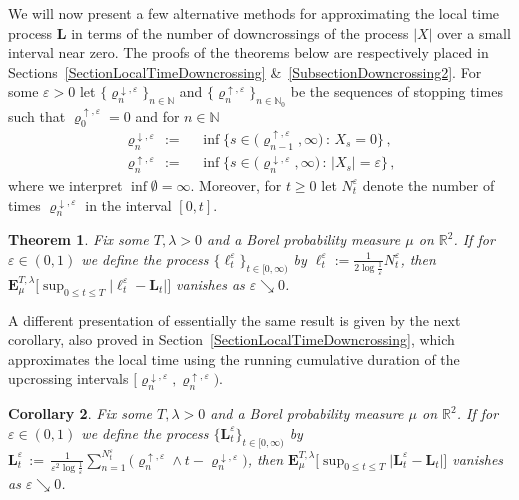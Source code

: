\documentclass[10pt]{article}
\numberwithin{equation}{section}
\newtheorem{theorem}{Theorem}[section]
\newtheorem{corollary}[theorem]{Corollary}
\theoremstyle{definition}
\newcommand{\R}{{\mathbb R}}
\begin{document}
We will now present  a few alternative methods for approximating the local time process $\mathbf{L}$ in terms of the number of downcrossings of the process $|X|$ over a small interval near zero. The proofs of the theorems below are respectively placed in Sections~\ref{SectionLocalTimeDowncrossing} \&~\ref{SubsectionDowncrossing2}.  For some $\varepsilon>0$  let $\{\varrho_{n}^{\downarrow,\varepsilon}\}_{n\in \mathbb{N}}$ and $\{\varrho_{n}^{\uparrow,\varepsilon}\}_{n\in \mathbb{N}_0}$ be the  sequences of stopping times such that $\varrho_{0}^{\uparrow,\varepsilon}=0$ and for $n\in \mathbb{N}$
\begin{align}\label{VARRHOS}
\varrho_{n}^{\downarrow,\varepsilon}\,:=\,&\,\inf\big\{s\in \big(\varrho_{n-1}^{\uparrow,\varepsilon},\infty\big) \,:\,X_s = 0 \big\}\,, \nonumber   \\
\varrho_{n}^{\uparrow,\varepsilon}\,:=\,&\,\inf\big\{s\in \big(\varrho_{n}^{\downarrow,\varepsilon},\infty\big)\,:\,|X_s| = \varepsilon  \big\}\,,
\end{align}
where we interpret $\inf \emptyset =\infty$.  Moreover, for $t\geq 0$ let  $N_{t}^{\varepsilon}$ denote the number of times $\varrho_{n}^{\downarrow,\varepsilon}$  in the interval $[0,t]$. 
\begin{theorem}\label{THMLocalTime1} Fix some $T,\lambda >0$ and  a Borel probability measure $\mu$  on $\R^2$. If for $\varepsilon\in (0,1)$ we define the process $\{\ell_{t}^{\varepsilon}\}_{t\in [0,\infty)}$ by $ \ell_{t}^{\varepsilon}:=\frac{1 }{  2\log \frac{1}{\varepsilon} }N_{t}^{\varepsilon}$, then $\mathbf{E}^{T,\lambda}_{\mu}\big[\sup_{0\leq t\leq T}\big|  \ell_t^{\varepsilon}  -\mathbf{L}_t  \big|    \big]$ vanishes as $\varepsilon \searrow 0$.
\end{theorem}

A different presentation of essentially  the same result is given by the next corollary, also proved in Section~\ref{SectionLocalTimeDowncrossing}, which  approximates the local time using the running cumulative duration of the upcrossing intervals $\big[\varrho_{n}^{\downarrow,\varepsilon},  \varrho_{n}^{\uparrow,\varepsilon}\big)$.  
\begin{corollary}\label{THMLocalTime1.5} Fix some $T,\lambda >0$ and a  Borel probability measure $\mu$  on $\R^2$.  If for $\varepsilon\in (0,1)$ we
  define the process   $\{\mathbf{L}_{t}^{\varepsilon}\}_{t\in [0,\infty)}$ by $ \mathbf{L}_{t}^{\varepsilon}\,:=\,\frac{1 }{ \varepsilon^2 \log \frac{1}{\varepsilon} }\sum_{n=1}^{N_{t}^{\varepsilon}} \big(\varrho_{n}^{\uparrow,\varepsilon}\wedge t-\varrho_{n}^{\downarrow ,\varepsilon}\big) $, then $\mathbf{E}^{T,\lambda}_{\mu}\big[\sup_{0\leq t\leq T}\big|  \mathbf{L}_{t}^{\varepsilon}  -\mathbf{L}_t  \big|    \big]$ vanishes as $\varepsilon \searrow 0$.     
\end{corollary}
\end{document}
